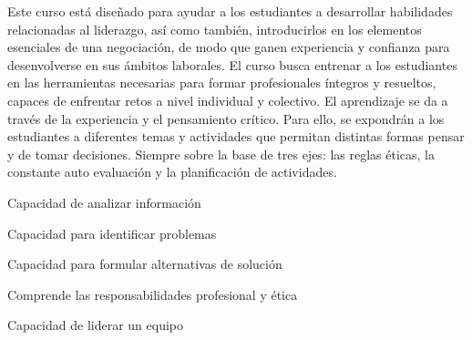 \begin{syllabus}


\begin{justification}
Este curso está diseñado para ayudar a los estudiantes a desarrollar habilidades relacionadas al liderazgo, así como también, introducirlos en los elementos esenciales de una negociación, de modo que ganen experiencia y confianza para desenvolverse en sus ámbitos laborales.
El curso busca entrenar a los estudiantes en las herramientas necesarias para formar profesionales íntegros y resueltos, capaces de enfrentar retos a nivel individual y colectivo. El aprendizaje se da a través de la experiencia y el pensamiento crítico. Para ello, se expondrán a los estudiantes a diferentes temas y actividades que permitan distintas formas pensar y de tomar decisiones. Siempre sobre la base de tres ejes: las reglas éticas, la
constante auto evaluación y la planificación de actividades.
\end{justification}

\begin{goals}
\item Capacidad de analizar información
\item Capacidad para identificar problemas
\item Capacidad para formular alternativas de solución
\item Comprende las responsabilidades profesional y ética
\item Capacidad de liderar un equipo
\end{goals}

\begin{outcomes}
    \item {} %
    \item {} %
    \item {} %
    \item {} %
    \item {} %
\end{outcomes}

\begin{competences}
    \item {}
    \item {}
    \item {}
    \item {}
\end{competences}


\end{syllabus}
